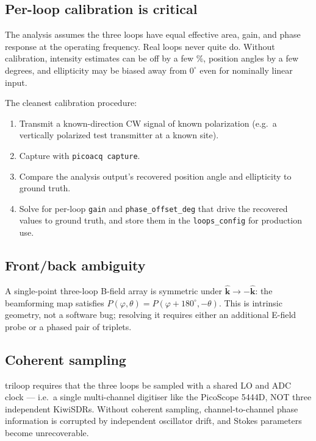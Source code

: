 \documentclass[11pt]{article}
\begin{document}
\subsection{Per-loop calibration is critical}

The analysis assumes the three loops have equal effective area, gain,
and phase response at the operating frequency.  Real loops never quite
do.  Without calibration, intensity estimates can be off by a few
\%, position angles by a few degrees, and ellipticity may be biased
away from $0^\circ$ even for nominally linear input.

The cleanest calibration procedure:

\begin{enumerate}\itemsep=2pt
\item Transmit a known-direction CW signal of known polarization
      (e.g.\ a vertically polarized test transmitter at a known site).
\item Capture with \texttt{picoacq capture}.
\item Compare the analysis output's recovered position angle and
      ellipticity to ground truth.
\item Solve for per-loop \texttt{gain} and \texttt{phase\_offset\_deg}
      that drive the recovered values to ground truth, and store them
      in the \texttt{loops\_config} for production use.
\end{enumerate}

\subsection{Front/back ambiguity}

A single-point three-loop B-field array is symmetric under
$\hat{\mathbf k}\to -\hat{\mathbf k}$: the beamforming map satisfies
$P(\varphi,\theta) = P(\varphi+180^\circ, -\theta)$.  This is intrinsic
geometry, not a software bug; resolving it requires either an
additional E-field probe or a phased pair of triplets.

\subsection{Coherent sampling}

\textsf{triloop} requires that the three loops be sampled with a
shared LO and ADC clock --- i.e.\ a single multi-channel digitiser like
the PicoScope 5444D, NOT three independent KiwiSDRs.  Without
coherent sampling, channel-to-channel phase information is corrupted
by independent oscillator drift, and Stokes parameters become
unrecoverable.
\end{document}
